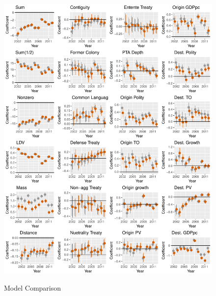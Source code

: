 \documentclass{article}
\begin{document}
\begin{figure}[h]
\centering
\includegraphics[scale=.75]{draft_figures/shift.pdf}\\
  \caption{Model Comparison}
  \label{fig:1}
\end{figure}
\end{document}
